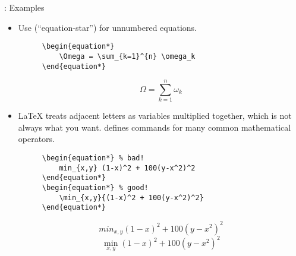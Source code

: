 \begin{frame}{\insertsubsection{}: Examples}
    \begin{itemize}
        \item Use  (``equation-star'') for unnumbered equations.
              \begin{figure}
                  \begin{minipage}{0.5\textwidth}
                      \begin{lstlisting}
\begin{equation*}
    \Omega = \sum_{k=1}^{n} \omega_k
\end{equation*}
        \end{lstlisting}
                  \end{minipage}
                  \begin{minipage}{0.4\textwidth}
                      \begin{equation*}
                          \Omega = \sum_{k=1}^{n} \omega_k
                      \end{equation*}
                  \end{minipage}
              \end{figure}
        \item \LaTeX{} treats adjacent letters as variables multiplied together, which
              is not always what you want.  defines commands for many common
              mathematical operators.
              \begin{figure}
                  \begin{minipage}{0.5\textwidth}
                      \begin{lstlisting}[basicstyle=\scriptsize]
\begin{equation*} % bad!
    min_{x,y} (1-x)^2 + 100(y-x^2)^2
\end{equation*}
\begin{equation*} % good!
    \min_{x,y}{(1-x)^2 + 100(y-x^2)^2}
\end{equation*}
        \end{lstlisting}
                  \end{minipage}
                  \begin{minipage}{0.4\textwidth}
                      \begin{equation*} %
                          min_{x,y} (1-x)^2 + 100(y-x^2)^2
                      \end{equation*}
                      \begin{equation*} %
                          \min_{x,y}{(1-x)^2 + 100(y-x^2)^2}
                      \end{equation*}
                  \end{minipage}
              \end{figure}
\vspace{1cm}


\end{itemize}
\end{frame}
